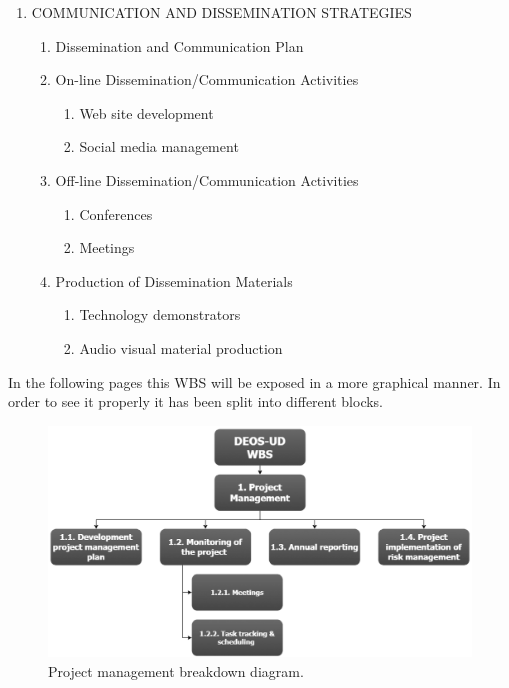 \begin{enumerate}[label*=\arabic*.]
	\item COMMUNICATION AND DISSEMINATION STRATEGIES
	
	\begin{enumerate}[label*=\arabic*.]
		\item Dissemination and Communication Plan
		\item On-line Dissemination/Communication Activities
		\begin{enumerate}[label*=\arabic*.]
			\item Web site development
			\item Social media management
		\end{enumerate}
		\item Off-line Dissemination/Communication Activities
		\begin{enumerate}[label*=\arabic*.]
			\item Conferences
			\item Meetings
		\end{enumerate}
		\item Production of Dissemination Materials
		\begin{enumerate}[label*=\arabic*.]
			\item Technology demonstrators
			\item Audio visual material production
		\end{enumerate}
	\end{enumerate}
	
\end{enumerate}

In the following pages this WBS will be exposed in a more graphical manner. In order to see it properly it has been split into different blocks. \\
\vspace{10mm}

\begin{figure}[H]
	\centering
	\includegraphics[width=\textwidth]{./sections/2.WBS/WBS_Section1}
	\caption[Project management breakdown diagram]{Project management breakdown diagram.}
	\label{fig:WBS_Section1}
\end{figure}

